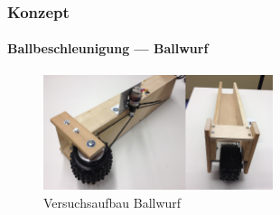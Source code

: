 \begin{frame}
    \frametitle{Konzept}
    \framesubtitle{Ballbeschleunigung --- Ballwurf}
    \begin{figure}[h!]
        \centering
        \includegraphics[width=0.6\textwidth]{../doc/fig/Schussvorrichtung.png}
        \caption{Versuchsaufbau Ballwurf}
    \end{figure}
\end{frame}

